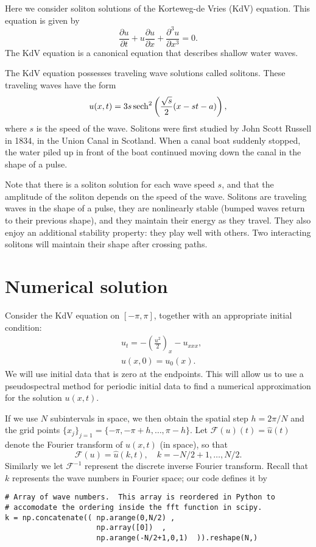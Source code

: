 \label{lab:solitons}


Here we consider soliton solutions of the Korteweg-de Vries (KdV) equation. This equation is given by 
\[  \frac{\partial u }{\partial t} + u \frac{\partial u}{\partial x} + \frac{\partial^3 u}{\partial x^3} = 0.
\]
The KdV equation is a canonical equation that describes shallow water waves. 

The KdV equation possesses traveling wave solutions called solitons.  
These traveling waves have the form 
\[ u(x,t) = 3s \operatorname{sech}^2\left(\frac{\sqrt{s}}{2}(x - st - a)\right),
\]
where $s$ is the speed of the wave. 
Solitons were first studied by John Scott Russell in 1834, in the Union Canal in Scotland. 
When a canal boat suddenly stopped, the water piled up in front of the boat continued moving down the canal in the shape of a pulse.  

Note that there is a soliton solution for each wave speed $s$, and that the amplitude of the soliton depends on the speed of the wave. 
Solitons are traveling waves in the shape of a pulse, they are nonlinearly stable (bumped waves return to their previous shape), and they maintain their energy as they travel. 
They also enjoy an additional stability property: they play well with others. 
Two interacting solitons will maintain their shape after crossing paths. 

\section*{Numerical solution}
Consider the KdV equation on $[-\pi,\pi]$, together with an appropriate initial condition: 
\begin{align*}
	 &{ }u_t = -\left(\frac{u^2}{2} \right)_x - u_{xxx},\\
     &{ }u(x,0) = u_0(x).
\end{align*}
We will use initial data that is zero at the endpoints.
This will allow us to use a pseudospectral method for periodic initial data to find a numerical approximation for the solution $u(x,t)$. 

If we use $N$ subintervals in space, we then obtain the spatial step $h = 2\pi/N$ and the grid points $\{x_j\}_{j=1} = \{-\pi,-\pi + h,\ldots,\pi-h\}$.  
Let $\mathcal{F}(u)(t) = \hat{u}(t)$ denote the Fourier transform of $u(x,t)$ (in space), so that 
\[
\mathcal{F}(u) = \hat{u}(k,t), \quad k=-N/2+1, \ldots, N/2.
\]
Similarly we let $\mathcal{F}^{-1}$ represent the discrete inverse Fourier transform.
Recall that $k$ represents the wave numbers in Fourier space; our code defines it by 
\begin{lstlisting}
# Array of wave numbers.  This array is reordered in Python to 
# accomodate the ordering inside the fft function in scipy.
k = np.concatenate(( np.arange(0,N/2) ,
					 np.array([0])	,
					 np.arange(-N/2+1,0,1)	)).reshape(N,)
\end{lstlisting}

